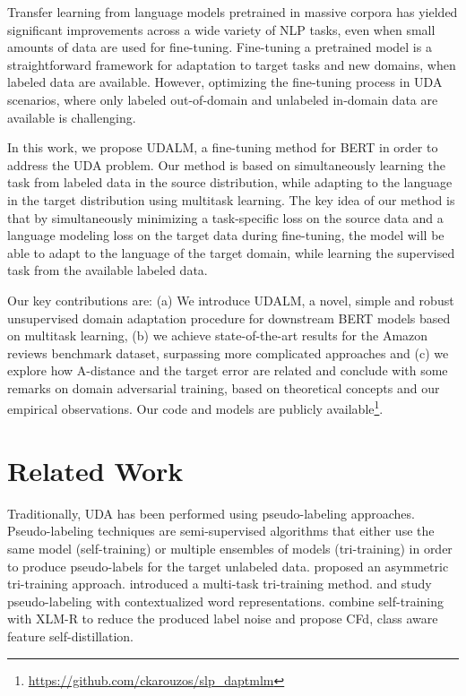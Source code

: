 \documentclass[11pt]{article}
\begin{document}
Transfer learning from language models pretrained in massive corpora \citep{howard-ruder-2018-universal, devlin-etal-2019-bert, yang2019xlnet, liu2019roberta,brown2020language} has yielded significant improvements across a wide variety of NLP tasks, even when small amounts of data are used for fine-tuning. 
Fine-tuning a pretrained model is a straightforward framework for adaptation to target tasks and new domains, when labeled data are available.
However, optimizing the fine-tuning process in UDA scenarios, where only labeled out-of-domain and unlabeled in-domain data are available is challenging.

In this work, we propose UDALM, a fine-tuning method for BERT  \citep{devlin-etal-2019-bert} in order to address the UDA problem. Our method is based on simultaneously learning the task from labeled data in the source distribution, while adapting to the language in the target distribution using multitask learning. The key idea of our method is that by simultaneously minimizing a task-specific loss on the source data and a language modeling loss on the target data during fine-tuning, the model will be able to adapt to the language of the target domain, while learning the supervised task from the available labeled data.

Our key contributions are: (a) We introduce UDALM, a novel, simple and robust unsupervised domain adaptation procedure for downstream BERT models based on multitask learning, (b) we achieve state-of-the-art results for the Amazon reviews benchmark dataset, surpassing more complicated approaches and (c) we explore how A-distance and the target error are related and conclude with some remarks on domain adversarial training, based on theoretical concepts and our empirical observations. Our code and models are publicly available\footnote{\href{https://github.com/ckarouzos/slp_daptmlm}{https://github.com/ckarouzos/slp\_daptmlm}}.

\section{Related Work}

Traditionally, UDA has been performed using pseudo-labeling approaches. Pseudo-labeling techniques are semi-supervised algorithms that either use the same model (self-training) \citep{yarowsky-1995-unsupervised, mcclosky-etal-2006-reranking, abney2007semisupervised} or multiple ensembles of models (tri-training) \citep{zhou2005tri, sogaard-2010-simple} in order to produce pseudo-labels for the target unlabeled data. \citet{saito2017asymmetric} proposed an asymmetric tri-training approach. \citet{ruder-plank-2018-strong} introduced a multi-task tri-training method. \citet{rotman-reichart-2019-deep} and \citet{lim2020semi}  study pseudo-labeling with contextualized word representations. \citet{ye_feature_2020} combine self-training with XLM-R \citep{conneau-etal-2020-unsupervised} to reduce the produced label noise and propose CFd, class aware feature self-distillation.
\end{document}
